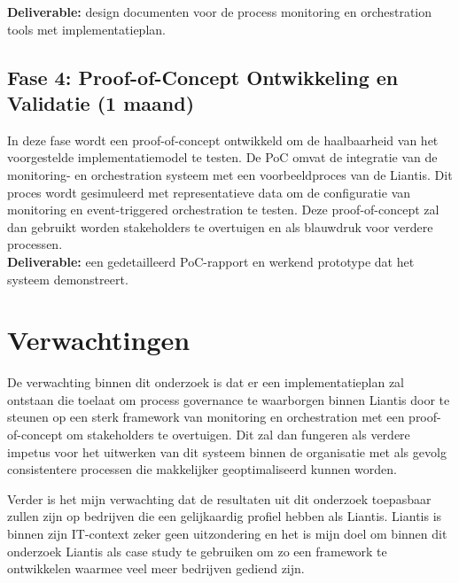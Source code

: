 \textbf{Deliverable:} design documenten voor de process monitoring en orchestration tools met implementatieplan.

\subsection{Fase 4: Proof-of-Concept Ontwikkeling en Validatie (1 maand)}

In deze fase wordt een proof-of-concept ontwikkeld om de haalbaarheid van het voorgestelde implementatiemodel te testen. De PoC omvat de integratie van de monitoring- en orchestration systeem met een voorbeeldproces van de Liantis. Dit proces wordt gesimuleerd met representatieve data om de configuratie van monitoring en event-triggered orchestration te testen. Deze proof-of-concept zal dan gebruikt worden stakeholders te overtuigen en als blauwdruk voor verdere processen. \\

\textbf{Deliverable:} een gedetailleerd PoC-rapport en werkend prototype dat het systeem demonstreert.

\section{Verwachtingen}%
\label{sec:verwachtingen}
De verwachting binnen dit onderzoek is dat er een implementatieplan zal ontstaan die toelaat om process governance te waarborgen binnen Liantis door te steunen op een sterk framework van monitoring en orchestration met een proof-of-concept om stakeholders te overtuigen. Dit zal dan fungeren als verdere impetus voor het uitwerken van dit systeem binnen de organisatie met als gevolg consistentere processen die makkelijker geoptimaliseerd kunnen worden.

Verder is het mijn verwachting dat de resultaten uit dit onderzoek toepasbaar zullen zijn op bedrijven die een gelijkaardig profiel hebben als Liantis. Liantis is binnen zijn IT-context zeker geen uitzondering en het is mijn doel om binnen dit onderzoek Liantis als case study te gebruiken om zo een framework te ontwikkelen waarmee veel meer bedrijven gediend zijn.

